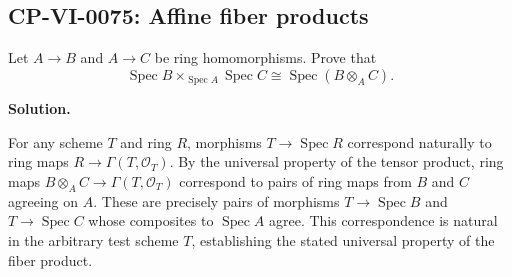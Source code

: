 
\subsection*{CP-VI-0075: Affine fiber products}

Let $A\to B$ and $A\to C$ be ring homomorphisms. Prove that
\[
\operatorname{Spec}B\times_{\operatorname{Spec}A}\operatorname{Spec}C
\cong \operatorname{Spec}(B\otimes_A C).
\]

\medskip
\noindent\textbf{Solution.}

For any scheme $T$ and ring $R$, morphisms $T\to\operatorname{Spec}R$ correspond naturally to ring maps $R\to\Gamma(T,\mathcal O_T)$. By the universal property of the tensor product, ring maps $B\otimes_A C\to\Gamma(T,\mathcal O_T)$ correspond to pairs of ring maps from $B$ and $C$ agreeing on $A$. These are precisely pairs of morphisms $T\to\operatorname{Spec}B$ and $T\to\operatorname{Spec}C$ whose composites to $\operatorname{Spec}A$ agree. This correspondence is natural in the arbitrary test scheme $T$, establishing the stated universal property of the fiber product.
